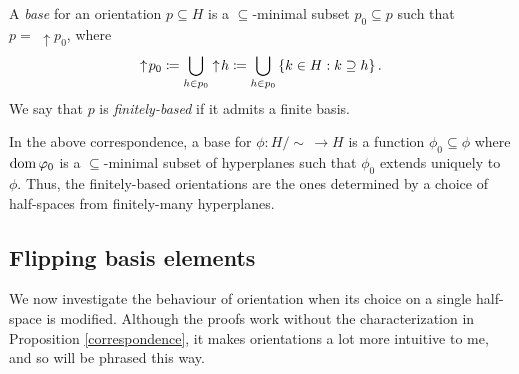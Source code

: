 \documentclass{amsart}
\begin{document}
    \begin{definition}
        A \textit{base} for an orientation $p\subseteq H$ is a $\subseteq$-minimal subset $p_0\subseteq p$ such that $p=\,\,\uparrow\!p_0$, where
        \begin{equation*}
            \uparrow\! p_0\coloneqq\bigcup_{h\in p_0}\uparrow\! h\coloneqq\bigcup_{h\in p_0}\left\{k\in H: k\supseteq h\right\}.
        \end{equation*}
        We say that $p$ is \textit{finitely-based} if it admits a finite basis.
    \end{definition}

    In the above correspondence, a base for $\phi:H/\!\sim\,\to H$ is a function $\phi_0\subseteq\phi$ where $\operatorname{dom}\varphi_0$ is a $\subseteq$-minimal subset of hyperplanes such that $\phi_0$ extends uniquely to $\phi$. Thus, the finitely-based orientations are the ones determined by a choice of half-spaces from finitely-many hyperplanes.

    \subsection{Flipping basis elements}

    We now investigate the behaviour of orientation when its choice on a single half-space is modified. Although the proofs work without the characterization in Proposition \ref{correspondence}, it makes orientations a lot more intuitive to me, and so will be phrased this way.
\end{document}
